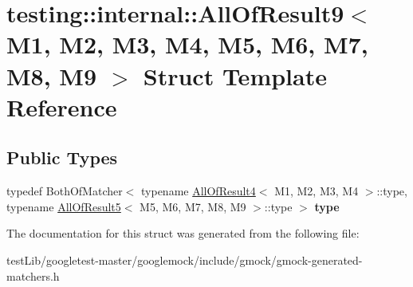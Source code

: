 \hypertarget{structtesting_1_1internal_1_1AllOfResult9}{}\section{testing\+:\+:internal\+:\+:All\+Of\+Result9$<$ M1, M2, M3, M4, M5, M6, M7, M8, M9 $>$ Struct Template Reference}
\label{structtesting_1_1internal_1_1AllOfResult9}
\subsection*{Public Types}
\begin{DoxyCompactItemize}
\item 
\mbox{\label{structtesting_1_1internal_1_1AllOfResult9_ade56e18d2e0b745968b87fc394710edc}} 
typedef Both\+Of\+Matcher$<$ typename \hyperlink{structtesting_1_1internal_1_1AllOfResult4}{All\+Of\+Result4}$<$ M1, M2, M3, M4 $>$\+::type, typename \hyperlink{structtesting_1_1internal_1_1AllOfResult5}{All\+Of\+Result5}$<$ M5, M6, M7, M8, M9 $>$\+::type $>$ {\bfseries type}
\end{DoxyCompactItemize}


The documentation for this struct was generated from the following file\+:\begin{DoxyCompactItemize}
\item 
test\+Lib/googletest-\/master/googlemock/include/gmock/gmock-\/generated-\/matchers.\+h\end{DoxyCompactItemize}
